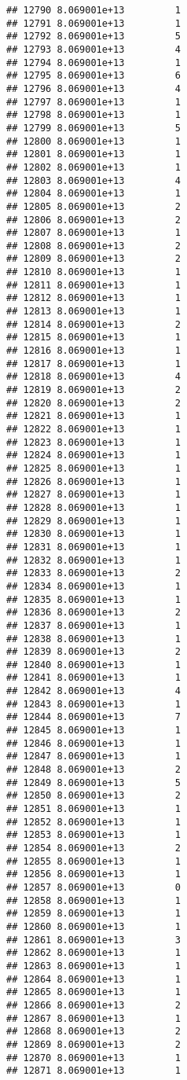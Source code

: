 \documentclass[
]{article}
\begin{document}
\begin{verbatim}
## 12790 8.069001e+13         1
## 12791 8.069001e+13         1
## 12792 8.069001e+13         5
## 12793 8.069001e+13         4
## 12794 8.069001e+13         1
## 12795 8.069001e+13         6
## 12796 8.069001e+13         4
## 12797 8.069001e+13         1
## 12798 8.069001e+13         1
## 12799 8.069001e+13         5
## 12800 8.069001e+13         1
## 12801 8.069001e+13         1
## 12802 8.069001e+13         1
## 12803 8.069001e+13         4
## 12804 8.069001e+13         1
## 12805 8.069001e+13         2
## 12806 8.069001e+13         2
## 12807 8.069001e+13         1
## 12808 8.069001e+13         2
## 12809 8.069001e+13         2
## 12810 8.069001e+13         1
## 12811 8.069001e+13         1
## 12812 8.069001e+13         1
## 12813 8.069001e+13         1
## 12814 8.069001e+13         2
## 12815 8.069001e+13         1
## 12816 8.069001e+13         1
## 12817 8.069001e+13         1
## 12818 8.069001e+13         4
## 12819 8.069001e+13         2
## 12820 8.069001e+13         2
## 12821 8.069001e+13         1
## 12822 8.069001e+13         1
## 12823 8.069001e+13         1
## 12824 8.069001e+13         1
## 12825 8.069001e+13         1
## 12826 8.069001e+13         1
## 12827 8.069001e+13         1
## 12828 8.069001e+13         1
## 12829 8.069001e+13         1
## 12830 8.069001e+13         1
## 12831 8.069001e+13         1
## 12832 8.069001e+13         1
## 12833 8.069001e+13         2
## 12834 8.069001e+13         1
## 12835 8.069001e+13         1
## 12836 8.069001e+13         2
## 12837 8.069001e+13         1
## 12838 8.069001e+13         1
## 12839 8.069001e+13         2
## 12840 8.069001e+13         1
## 12841 8.069001e+13         1
## 12842 8.069001e+13         4
## 12843 8.069001e+13         1
## 12844 8.069001e+13         7
## 12845 8.069001e+13         1
## 12846 8.069001e+13         1
## 12847 8.069001e+13         1
## 12848 8.069001e+13         2
## 12849 8.069001e+13         5
## 12850 8.069001e+13         2
## 12851 8.069001e+13         1
## 12852 8.069001e+13         1
## 12853 8.069001e+13         1
## 12854 8.069001e+13         2
## 12855 8.069001e+13         1
## 12856 8.069001e+13         1
## 12857 8.069001e+13         0
## 12858 8.069001e+13         1
## 12859 8.069001e+13         1
## 12860 8.069001e+13         1
## 12861 8.069001e+13         3
## 12862 8.069001e+13         1
## 12863 8.069001e+13         1
## 12864 8.069001e+13         1
## 12865 8.069001e+13         1
## 12866 8.069001e+13         2
## 12867 8.069001e+13         1
## 12868 8.069001e+13         2
## 12869 8.069001e+13         2
## 12870 8.069001e+13         1
## 12871 8.069001e+13         1

\end{verbatim}
\end{document}
